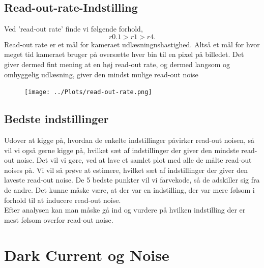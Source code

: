 \documentclass[working]{tuftebook}
\begin{document}
\subsection{Read-out-rate-Indstilling}
Ved 'read-out rate' finde vi følgende forhold,
\[
r0.1 > r1 > r4
.\]
Read-out rate er et mål for kameraet udlæsningnshastighed. Altså et mål for hvor meget tid kameraet bruger på oversætte hver bin til en pixel på billedet. Det giver dermed fint mening at en høj read-out rate, og dermed langsom og omhyggelig udlæsning, giver den mindst mulige read-out noise
\begin{figure}[ht]
\centering
{}
\texttt{[image: ../Plots/read-out-rate.png]}	

\end{figure}
\subsection{Bedste indstillinger}
Udover at kigge på, hvordan de enkelte indstillinger påvirker read-out noisen, så  vil vi også gerne kigge på, hvilket sæt af indstillinger der giver den mindste read-out noise. Det vil vi gøre, ved at lave et samlet plot med alle de målte read-out noises på. Vi vil så prøve at estimere, hvilket sæt af indstillinger der giver den laveste read-out noise. De 5 bedste punkter vil vi farvekode, så de adskiller sig fra de andre. Det kunne måske være, at der var en indstilling, der var mere følsom i forhold til at inducere read-out noise. 
\\
Efter analysen kan man måske gå ind og vurdere på hvilken indstilling der er mest følsom overfor read-out noise. 
\section{Dark Current og Noise}
\end{document}
